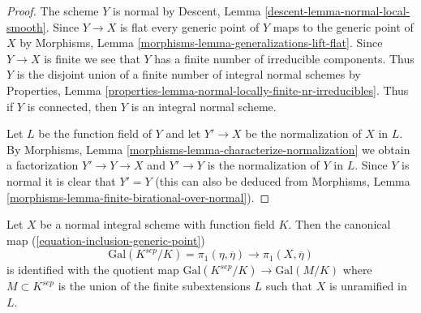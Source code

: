 \begin{proof}
The scheme $Y$ is normal by
Descent, Lemma \ref{descent-lemma-normal-local-smooth}.
Since $Y \to X$ is flat every generic point of $Y$ maps
to the generic point of $X$ by
Morphisms, Lemma \ref{morphisms-lemma-generalizations-lift-flat}.
Since $Y \to X$ is finite we see that $Y$ has a finite number
of irreducible components. Thus $Y$ is the disjoint union of
a finite number of integral normal schemes by
Properties, Lemma \ref{properties-lemma-normal-locally-finite-nr-irreducibles}.
Thus if $Y$ is connected, then $Y$ is an integral normal scheme.

\medskip\noindent
Let $L$ be the function field of $Y$ and let $Y' \to X$ be the normalization
of $X$ in $L$. By
Morphisms, Lemma \ref{morphisms-lemma-characterize-normalization}
we obtain a factorization $Y' \to Y \to X$ and $Y' \to Y$ is
the normalization of $Y$ in $L$. Since $Y$ is normal it is clear
that $Y' = Y$ (this can also be deduced from
Morphisms, Lemma \ref{morphisms-lemma-finite-birational-over-normal}).
\end{proof}

\begin{proposition}
\label{proposition-normal}
Let $X$ be a normal integral scheme with function field $K$.
Then the canonical map (\ref{equation-inclusion-generic-point})
$$
\text{Gal}(K^{sep}/K) = \pi_1(\eta, \overline{\eta})
\longrightarrow \pi_1(X, \overline{\eta})
$$
is identified with the quotient map
$\text{Gal}(K^{sep}/K) \to \text{Gal}(M/K)$ where $M \subset K^{sep}$
is the union of the finite subextensions $L$
such that $X$ is unramified in $L$.
\end{proposition}


